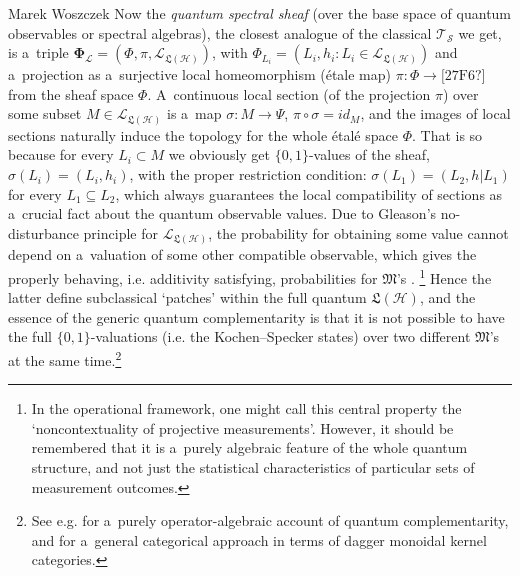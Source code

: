 \begin{artengenv}{Marek Woszczek}
Now the \textit{quantum spectral sheaf} (over the base space of quantum observables or spectral algebras), the closest analogue of the classical $\bm{\mathcal{T}}_{\mathcal{S}}$ we get, is a~triple $\bm{\Phi}_\mathcal{L} = (\Phi, \pi, \mathcal{L}_{\bm{\mathfrak{L}}(\mathcal{H})})$, with $\Phi_{L_i}=(L_i,h_i:L_i{\in}\mathcal{L}_{\bm{\mathfrak{L}}(\mathcal{H})})$ and a~projection as a~surjective local homeomorphism (étale map) $\pi :\Phi \to \text{[27F6?]}$ from the sheaf space $\Phi $. A~continuous local section (of the projection $\pi$) over some subset $M \in \mathcal{L}_{\bm{\mathfrak{L}}(\mathcal{H})}$ is a~map $\sigma: M \to \Psi$, $\pi \circ \sigma =\mathit{id}_M$, and the images of local sections naturally induce the topology for the whole étalé space $\Phi$. That is so because for every $L_i \subset M$ we obviously get $\{0,1\}$-values of the sheaf, $\sigma (L_i)=(L_i,h_i)$, with the proper restriction condition: $\sigma (L_1)=(\left.L_2,h\right|L_1)$ for every $L_1\subseteq L_2$, which always guarantees the local compatibility of sections as a~crucial fact about the quantum observable values. Due to Gleason's no-disturbance principle for $\mathcal{L}_{\bm{\mathfrak{L}}(\mathcal{H})}$, the probability for obtaining some value cannot depend on a~valuation of some other compatible observable, which gives the properly behaving, i.e. additivity satisfying, probabilities for $\bm{\mathfrak{M}}$'s
\parencite[][]{gleason_measures_1957}.%
\footnote{In the operational framework, one might call this central property the ‘noncontextuality of projective measurements'. However, it should be remembered that it is a~purely algebraic feature of the whole quantum structure, and not just the statistical characteristics of particular sets of measurement outcomes.} Hence the latter define subclassical ‘patches' within the full quantum $\bm{\mathfrak{L}}(\mathcal{H})$, and the essence of the generic quantum complementarity is that it is not possible to have the full $\{0,1\}$-valuations (i.e. the Kochen–Specker states) over two different $\bm{\mathfrak{M}}$'s at the same time.\footnote{See e.g. 
\parencite[][]{heunen_bohrification_2012} %
 for a~purely operator-algebraic account of quantum complementarity, and 
\parencite[][]{heunen_bohrification_2012} %
 for a~general categorical approach in terms of dagger monoidal kernel categories.}


\end{artengenv}
